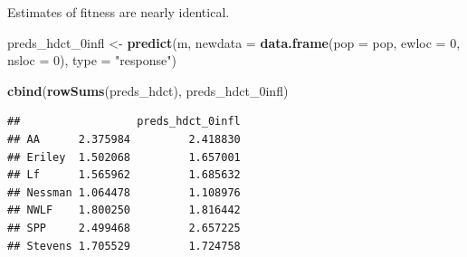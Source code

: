 \documentclass[
  ignorenonframetext,
]{beamer}
\newenvironment{Shaded}{\begin{snugshade}}{\end{snugshade}}
\newcommand{\AttributeTok}[1]{\textcolor[rgb]{0.13,0.29,0.53}{#1}}
\newcommand{\DecValTok}[1]{\textcolor[rgb]{0.00,0.00,0.81}{#1}}
\newcommand{\FunctionTok}[1]{\textcolor[rgb]{0.13,0.29,0.53}{\textbf{#1}}}
\newcommand{\NormalTok}[1]{#1}
\newcommand{\OtherTok}[1]{\textcolor[rgb]{0.56,0.35,0.01}{#1}}
\newcommand{\StringTok}[1]{\textcolor[rgb]{0.31,0.60,0.02}{#1}}
\begin{document}
\begin{frame}[fragile]{}
\protect\hypertarget{section-43}{}
Estimates of fitness are nearly identical.

\vspace{12pt}
\tiny

\begin{Shaded}
\begin{Highlighting}[]
\NormalTok{preds\_hdct\_0infl }\OtherTok{\textless{}{-}} \FunctionTok{predict}\NormalTok{(m, }
  \AttributeTok{newdata =} \FunctionTok{data.frame}\NormalTok{(}\AttributeTok{pop =}\NormalTok{ pop, }\AttributeTok{ewloc =} \DecValTok{0}\NormalTok{, }\AttributeTok{nsloc =} \DecValTok{0}\NormalTok{), }
  \AttributeTok{type =} \StringTok{"response"}\NormalTok{)}

\FunctionTok{cbind}\NormalTok{(}\FunctionTok{rowSums}\NormalTok{(preds\_hdct), preds\_hdct\_0infl)}
\end{Highlighting}
\end{Shaded}

\begin{verbatim}
##                  preds_hdct_0infl
## AA      2.375984         2.418830
## Eriley  1.502068         1.657001
## Lf      1.565962         1.685632
## Nessman 1.064478         1.108976
## NWLF    1.800250         1.816442
## SPP     2.499468         2.657225
## Stevens 1.705529         1.724758
\end{verbatim}
\end{frame}
\end{document}
